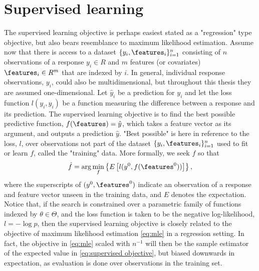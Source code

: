 \section{Supervised learning}

The supervised learning objective is perhaps easiest stated as a "regression" type objective, but also bears resemblance to maximum likelihood estimation.
Assume now that there is access to a dataset
$\{y_i,\features_i\}_{i=1}^n$
consisting of $n$ observations of a response $y_i\in R$ and $m$ features (or covariates) $\features_i\in R^{m}$ that are indexed by $i$.
In general, individual response observations, $y_i$, could also be multidimensional, but throughout this thesis they are assumed one-dimensional.
Let $\hat{y}_i$ be a prediction for $y_i$ and let the loss function $l(y_i,\hat{y}_i)$ be a function measuring the difference between a response and its prediction.
The supervised learning objective is to find the best possible predictive function, $f(\features)=\hat{y}$, which takes a feature vector as its argument, and outputs a prediction $\hat{y}$. "Best possible" is here in reference to the loss, $l$, over observations not part of the dataset $\{y_i,\features_i\}_{i=1}^n$ used to fit or learn $f$, called the "training" data.
More formally, we seek $f$ so that
\begin{align}\label{eq:supervised objective}
	\hat{f} = \arg\min_f \left\{ E\left[l(y^0, f(\features^0))\right] \right\},
\end{align} 
where the superscripts of $(y^0, \features^0)$ indicate an observation of a response and feature vector unseen in the training data, and $E$ denotes the expectation.
Notice that, if the search is constrained over a parametric family of functions indexed by $\theta\in\Theta$, and the loss function is taken to be the negative log-likelihood, $l=-\log p$, then the supervised learning objective is closely related to the objective of maximum likelihood estimation \eqref{eq:mle} in a regression setting.
In fact, the objective in \eqref{eq:mle} scaled with $n^{-1}$ will then be the sample estimator of the expected value in \eqref{eq:supervised objective}, but biased downwards in expectation, as evaluation is done over observations in the training set.
